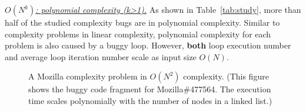 {\underline{\textit{$O(N^k)$: polynomial complexity (k>1).}}}
As shown in Table~\ref{tab:study}, 
more than half of the studied complexity bugs are in polynomial complexity. 
Similar to complexity problems in linear complexity,
polynomial complexity for each problem is also caused by a buggy loop.
However, {\bf both} loop execution number and average loop iteration number
scale as input size $O(N)$.

\begin{figure}
\centering
{}
  \mbox{}
\caption{A Mozilla complexity problem in $O(N^2)$ complexity.
\footnotesize{(This figure shows the buggy code fragment for Mozilla\#477564. 
The execution time scales polynomially with the number of nodes in a linked list.)}}
\vspace{-0.05in}
\label{fig:Mozilla477564}\vspace{-0.05in}
\end{figure}

